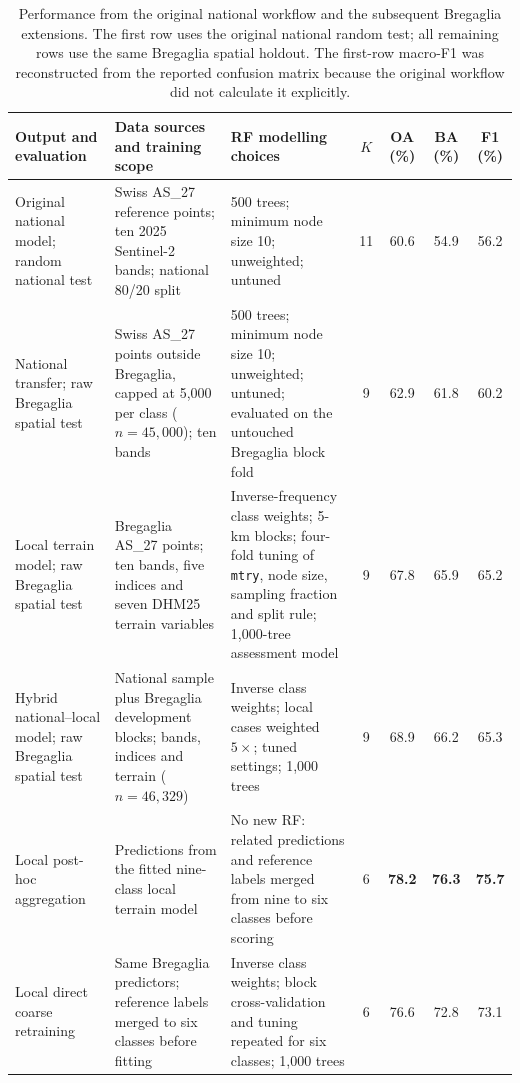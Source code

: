 \begin{table}[!htbp]
  \centering
  \caption{Performance from the original national workflow and the subsequent
  Bregaglia extensions. The first row uses the original national random test;
  all remaining rows use the same Bregaglia spatial holdout. The first-row
  macro-F1 was reconstructed from the reported confusion matrix because the
  original workflow did not calculate it explicitly.}
  \label{tab:rf-model-comparison}
  \scriptsize
  \setlength{\tabcolsep}{3pt}
  \begin{tabularx}{\textwidth}{@{}p{}XXcccc@{}}
    \toprule
    Output and evaluation & Data sources and training scope & RF modelling choices & $K$ & OA (\%) & BA (\%) & F1 (\%) \\
    \midrule
    Original national model; random national test
      & Swiss AS\_27 reference points; ten 2025 Sentinel-2 bands; national 80/20 split
      & 500 trees; minimum node size 10; unweighted; untuned
      & 11 & 60.6 & 54.9 & 56.2 \\
    National transfer; raw Bregaglia spatial test
      & Swiss AS\_27 points outside Bregaglia, capped at 5,000 per class ($n=45{,}000$); ten bands
      & 500 trees; minimum node size 10; unweighted; untuned; evaluated on the untouched Bregaglia block fold
      & 9 & 62.9 & 61.8 & 60.2 \\
    Local terrain model; raw Bregaglia spatial test
      & Bregaglia AS\_27 points; ten bands, five indices and seven DHM25 terrain variables
      & Inverse-frequency class weights; 5-km blocks; four-fold tuning of \texttt{mtry}, node size, sampling fraction and split rule; 1,000-tree assessment model
      & 9 & 67.8 & 65.9 & 65.2 \\
    Hybrid national--local model; raw Bregaglia spatial test
      & National sample plus Bregaglia development blocks; bands, indices and terrain ($n=46{,}329$)
      & Inverse class weights; local cases weighted $5\times$; tuned settings; 1,000 trees
      & 9 & 68.9 & 66.2 & 65.3 \\
    Local post-hoc aggregation
      & Predictions from the fitted nine-class local terrain model
      & No new RF: related predictions and reference labels merged from nine to six classes before scoring
      & 6 & \textbf{78.2} & \textbf{76.3} & \textbf{75.7} \\
    Local direct coarse retraining
      & Same Bregaglia predictors; reference labels merged to six classes before fitting
      & Inverse class weights; block cross-validation and tuning repeated for six classes; 1,000 trees
      & 6 & 76.6 & 72.8 & 73.1 \\
    \bottomrule
  \end{tabularx}
\end{table}

